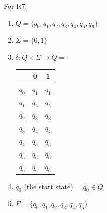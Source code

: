 \documentclass[11pt,a4paper]{article}
\begin{document}
\begin{enumerate}
            For R7:
            \begin{enumerate}
                \item $Q = \{q_0, q_1, q_2, q_3, q_4, q_5, q_6\}$
                \item $\Sigma = \{0, 1\}$
                \item $\delta \colon Q \times \Sigma \rightarrow Q =$
                \begin{tabular}{c|c|c}
                     & 0 & 1 \\ \hline
                    $q_0$ & $q_1$ & $q_1$ \\ \hline
                    $q_1$ & $q_2$ & $q_2$ \\ \hline
                    $q_2$ & $q_3$ & $q_3$ \\ \hline
                    $q_3$ & $q_4$ & $q_4$ \\ \hline
                    $q_4$ & $q_5$ & $q_5$ \\ \hline
                    $q_5$ & $q_6$ & $q_6$ \\ \hline
                    $q_6$ & $q_6$ & $q_6$ \\ \hline
                \end{tabular}
                \item $q_0$ (the start state) = $q_0 \in Q$
                \item $F = \{q_0, q_1, q_2, q_3, q_4, q_5\}$
            \end{enumerate}


            
            
        \end{enumerate}
            

    
\end{document}
